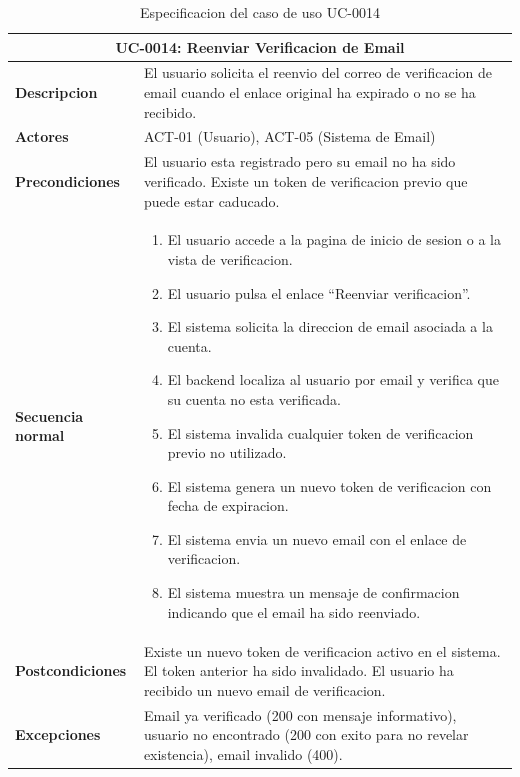 \documentclass[11pt, a4paper]{article}
\begin{document}
\begin{table}[H]
\centering
\renewcommand{\arraystretch}{1.4}
\small
\begin{tabular}{|p{2.8cm}|p{8cm}|}
\hline
\multicolumn{2}{|c|}{\textbf{UC-0014: Reenviar Verificacion de Email}} \\
\hline
\textbf{Descripcion} & El usuario solicita el reenvio del correo de verificacion de email cuando el enlace original ha expirado o no se ha recibido. \\
\hline
\textbf{Actores} & ACT-01 (Usuario), ACT-05 (Sistema de Email) \\
\hline
\textbf{Precondiciones} & El usuario esta registrado pero su email no ha sido verificado. Existe un token de verificacion previo que puede estar caducado. \\
\hline
\textbf{Secuencia normal} &
\begin{enumerate}[nosep,leftmargin=*]
    \item El usuario accede a la pagina de inicio de sesion o a la vista de verificacion.
    \item El usuario pulsa el enlace ``Reenviar verificacion''.
    \item El sistema solicita la direccion de email asociada a la cuenta.
    \item El backend localiza al usuario por email y verifica que su cuenta no esta verificada.
    \item El sistema invalida cualquier token de verificacion previo no utilizado.
    \item El sistema genera un nuevo token de verificacion con fecha de expiracion.
    \item El sistema envia un nuevo email con el enlace de verificacion.
    \item El sistema muestra un mensaje de confirmacion indicando que el email ha sido reenviado.
\end{enumerate} \\
\hline
\textbf{Postcondiciones} & Existe un nuevo token de verificacion activo en el sistema. El token anterior ha sido invalidado. El usuario ha recibido un nuevo email de verificacion. \\
\hline
\textbf{Excepciones} & Email ya verificado (200 con mensaje informativo), usuario no encontrado (200 con exito para no revelar existencia), email invalido (400). \\
\hline
\end{tabular}
\caption{Especificacion del caso de uso UC-0014}
\end{table}
\end{document}
